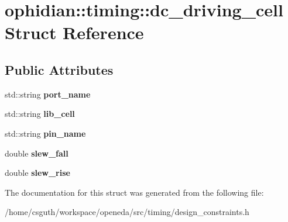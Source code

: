 \hypertarget{structophidian_1_1timing_1_1dc__driving__cell}{\section{ophidian\-:\-:timing\-:\-:dc\-\_\-driving\-\_\-cell Struct Reference}
\label{structophidian_1_1timing_1_1dc__driving__cell}
}
\subsection*{Public Attributes}
\begin{DoxyCompactItemize}
\item 
\hypertarget{structophidian_1_1timing_1_1dc__driving__cell_aa262b8b165b70c9fc7486cd9b7e15073}{std\-::string {\bfseries port\-\_\-name}}\label{structophidian_1_1timing_1_1dc__driving__cell_aa262b8b165b70c9fc7486cd9b7e15073}

\item 
\hypertarget{structophidian_1_1timing_1_1dc__driving__cell_ab5e6a3d6be3b3ade1f127c0548c0de60}{std\-::string {\bfseries lib\-\_\-cell}}\label{structophidian_1_1timing_1_1dc__driving__cell_ab5e6a3d6be3b3ade1f127c0548c0de60}

\item 
\hypertarget{structophidian_1_1timing_1_1dc__driving__cell_ad421f3dc1d7a87522d4fa57cb6002bc2}{std\-::string {\bfseries pin\-\_\-name}}\label{structophidian_1_1timing_1_1dc__driving__cell_ad421f3dc1d7a87522d4fa57cb6002bc2}

\item 
\hypertarget{structophidian_1_1timing_1_1dc__driving__cell_aed437762142625c7a297d9aab09e7eab}{double {\bfseries slew\-\_\-fall}}\label{structophidian_1_1timing_1_1dc__driving__cell_aed437762142625c7a297d9aab09e7eab}

\item 
\hypertarget{structophidian_1_1timing_1_1dc__driving__cell_a264e5487e7ade7e9eb3fa889d5c2912f}{double {\bfseries slew\-\_\-rise}}\label{structophidian_1_1timing_1_1dc__driving__cell_a264e5487e7ade7e9eb3fa889d5c2912f}

\end{DoxyCompactItemize}


The documentation for this struct was generated from the following file\-:\begin{DoxyCompactItemize}
\item 
/home/csguth/workspace/openeda/src/timing/design\-\_\-constraints.\-h\end{DoxyCompactItemize}
